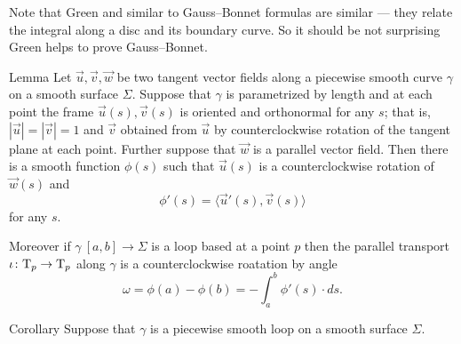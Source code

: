 Note that Green and similar to Gauss--Bonnet formulas are similar --- they relate the integral along a disc and its boundary curve.
So it should be not surprising Green helps to prove Gauss--Bonnet.

\begin{thm}{Lemma}
Let $\vec u,\vec v,\vec w$ be two tangent vector fields along a piecewise smooth curve $\gamma$ on a smooth surface $\Sigma$.
Suppose that $\gamma$ is parametrized by length and
at each point the frame $\vec u(s),\vec v(s)$ is oriented and orthonormal for any $s$;
that is, $|\vec u|=|\vec v|=1$ and $\vec v$ obtained from $\vec u$ by counterclockwise rotation of the tangent plane at each point.
Further suppose that $\vec w$ is a parallel vector field.
Then there is a smooth function $\phi(s)$ such that $\vec u(s)$ is a counterclockwise rotation of $\vec w(s)$ and
\[\phi'(s)=\langle\vec u'(s),\vec v(s)\rangle\]
for any $s$.

Moreover if $\gamma\:[a,b]\to\Sigma$ is a loop based at a point $p$ then the parallel transport $\iota\colon\mathrm{T}_p\to\mathrm{T}_p$ along $\gamma$ is a counterclockwise roatation by angle
\[\omega=\phi(a)-\phi(b)=-\int_a^b\phi'(s)\cdot ds.\]
\end{thm}

\begin{thm}{Corollary}
Suppose that $\gamma$ is a piecewise smooth loop on a smooth surface $\Sigma$.
\end{thm}
